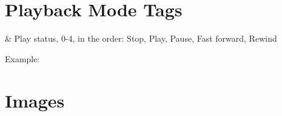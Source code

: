 \section{Playback Mode Tags}
\begin{table}
  \begin{tagmap}{}{}
     & Play status, 0-4, in the order: Stop, Play, Pause, 
           Fast forward, Rewind\\
  \end{tagmap}
\end{table}
Example: 

\section{Images}
